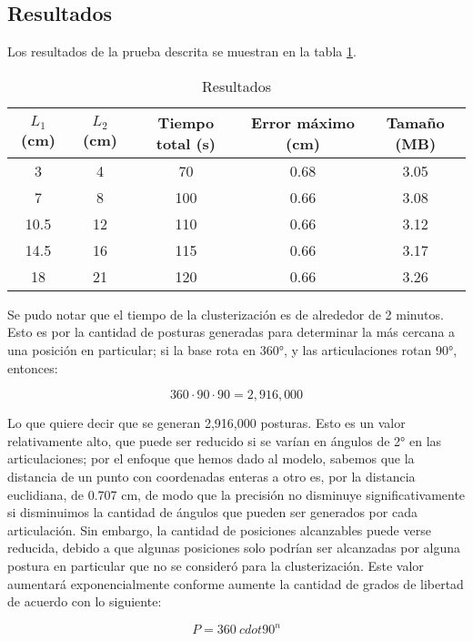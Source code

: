 \subsection{Resultados}

Los resultados de la prueba descrita se muestran en la tabla \ref{tab:Resultados}.

\begin{table}[ht]
	\centering
	\begin{tabular}{|c|c|c|c|c|}
		\hline
		\textbf{$L_1$ (cm)} & \textbf{$L_2$ (cm)} & \textbf{Tiempo total (s)} & \textbf{Error máximo (cm)} & \textbf{Tamaño (MB)} \\
		\hline
		3 & 4 & 70 & 0.68 & 3.05 \\
		7 & 8 & 100 & 0.66 & 3.08 \\
		10.5 & 12 & 110 & 0.66 & 3.12 \\
		14.5 & 16 & 115 & 0.66 & 3.17 \\
		18 & 21 & 120 & 0.66 & 3.26 \\
		\hline
	\end{tabular}
	\caption{Resultados}
	\label{tab:Resultados}
\end{table}

Se pudo notar que el tiempo de la clusterización es de alrededor de 2 minutos. Esto es por la cantidad de posturas generadas para determinar la más cercana a una posición en particular; si la base rota en 360°, y las articulaciones rotan 90°, entonces:

\begin{equation}
	360 \cdot 90 \cdot 90 = 2,916,000
\end{equation}

Lo que quiere decir que se generan 2,916,000 posturas. Esto es un valor relativamente alto, que puede ser reducido si se varían en ángulos de 2° en las articulaciones; por el enfoque que hemos dado al modelo, sabemos que la distancia de un punto con coordenadas enteras a otro es, por la distancia euclidiana, de 0.707 cm, de modo que la precisión no disminuye significativamente si disminuimos la cantidad de ángulos que pueden ser generados por cada articulación. Sin embargo, la cantidad de posiciones alcanzables puede verse reducida, debido a que algunas posiciones solo podrían ser alcanzadas por alguna postura en particular que no se consideró para la clusterización. Este valor aumentará exponencialmente conforme aumente la cantidad de grados de libertad de acuerdo con lo siguiente:

\begin{equation}
	P = 360 \ cdot 90^n
\end{equation}



